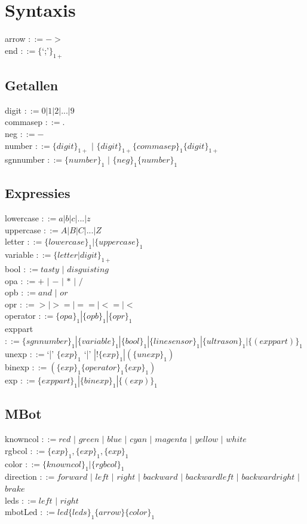 \documentclass[12pt,a4paper]{report}
\begin{document}
\chapter{Syntaxis}
arrow $::= ->$\\
end $::= \{$`;'$\}_{1+}$\\

\section{Getallen}
digit $::= 0|1|2|...|9$\\
commasep $::= .$\\
neg $::= -$\\
number $::= \{digit\}_{1+}$ $|$ $\{digit\}_{1+}\{commasep\}_{1}\{digit\}_{1+}$\\
sgnnumber $::= \{number\}_{1}$ $|$ $\{neg\}_{1}\{number\}_{1}$\\

\section{Expressies}
lowercase $::= a|b|c|...|z$\\
uppercase $::= A|B|C|...|Z$\\
letter $::= \{lowercase\}_{1} | \{uppercase\}_{1}$\\
variable $::= \{letter|digit\}_{1+}$\\
bool $::= tasty$ $|$ $disguisting$\\
opa $::= +$ $|$ $-$ $|$ $*$ $|$ $/$\\
opb $::= and$ $|$ $or$\\
opr $::= >|>=|==|<=|<$\\
operator $::= \{opa\}_{1} | \{opb\}_{1} | \{opr\}_{1}$\\
exppart $::= \{sgnnumber\}_{1} | \{variable\}_{1} | \{bool\}_{1} | \{linesensor\}_{1} | \{ultrason\}_{1} | \{(exppart)\}_{1}$\\
unexp $::= $`|' $\{exp\}_{1}$ `|' $| !\{exp\}_{1} | (\{unexp\}_{1})$\\
binexp $::= (\{exp\}_{1} \{operator\}_{1} \{exp\}_{1})$\\
exp $::= \{exppart\}_{1} | \{binexp\}_{1} | \{(exp)\}_{1}$\\

\section{MBot}
knowncol $::= red$ $|$ $green$ $|$ $blue$ $|$ $cyan$ $|$ $magenta$ $|$ $yellow$ $|$ $white$\\
rgbcol $::= \{exp\}_{1}, \{exp\}_{1}, \{exp\}_{1}$\\
color $::= \{knowncol\}_{1} | \{rgbcol\}_{1}$\\
direction $::= forward$ $|$ $left$ $|$ $right$ $|$ $backward$ $|$ $backwardleft$ $|$ $backwardright$ $|$ $brake$\\
leds $::= left$ $|$ $right$\\
mbotLed $::= led \{leds\}_{1} \{arrow\} \{color\}_{1} $\\
\end{document}
